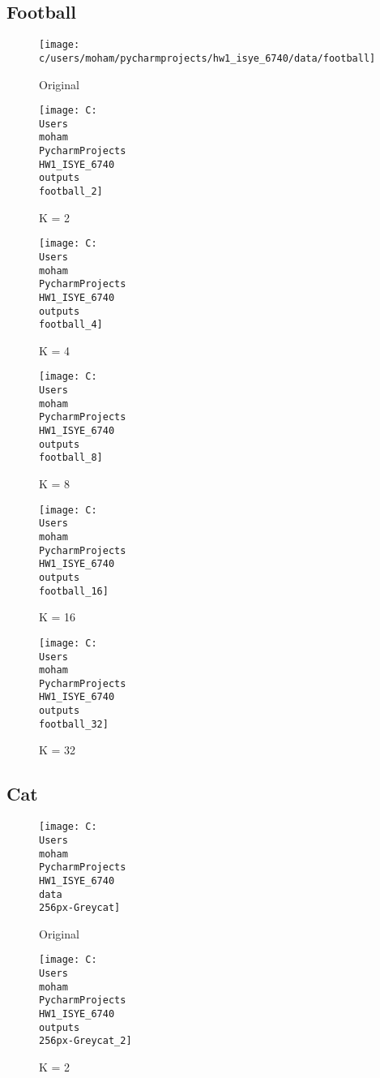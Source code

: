 \documentclass[twoside,10pt]{article}
\begin{document}
\subsection{Football}
\begin{figure}
    \centering
    \texttt{[image: c/users/moham/pycharmprojects/hw1\_isye\_6740/data/football]}
    \caption{Original}
    \label{fig:football}
\end{figure}

\begin{figure}
    \centering
    \texttt{[image: C:\\Users\\moham\\PycharmProjects\\HW1\_ISYE\_6740\\outputs\\football\_2]}
    \caption{K = 2}
    \label{fig:football_2}
\end{figure}

\begin{figure}
    \centering
    \texttt{[image: C:\\Users\\moham\\PycharmProjects\\HW1\_ISYE\_6740\\outputs\\football\_4]}
    \caption{K = 4}
    \label{fig:football_4}
\end{figure}

\begin{figure}
    \centering
    \texttt{[image: C:\\Users\\moham\\PycharmProjects\\HW1\_ISYE\_6740\\outputs\\football\_8]}
    \caption{K = 8}
    \label{fig:football_8}
\end{figure}

\begin{figure}
    \centering
    \texttt{[image: C:\\Users\\moham\\PycharmProjects\\HW1\_ISYE\_6740\\outputs\\football\_16]}
    \caption{K = 16}
    \label{fig:football_16}
\end{figure}


\begin{figure}
    \centering
    \texttt{[image: C:\\Users\\moham\\PycharmProjects\\HW1\_ISYE\_6740\\outputs\\football\_32]}
    \caption{K = 32}
    \label{fig:football_32}
\end{figure}

\subsection{Cat}
\begin{figure}
    \centering
    \texttt{[image: C:\\Users\\moham\\PycharmProjects\\HW1\_ISYE\_6740\\data\\256px-Greycat]}
    \caption{Original}
    \label{fig:256px-greycat}
\end{figure}

\begin{figure}
    \centering
    \texttt{[image: C:\\Users\\moham\\PycharmProjects\\HW1\_ISYE\_6740\\outputs\\256px-Greycat\_2]}
    \caption{K = 2}
    \label{fig:256px-greycat_2}
\end{figure}
\end{document}
